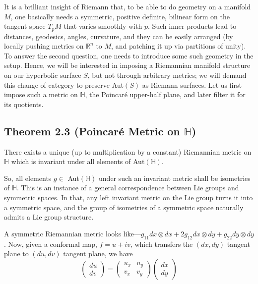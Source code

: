\documentclass[11pt,a4paper]{article}
\begin{document}
        It is a brilliant insight of Riemann that, to be able to do geometry on a manifold $M$, one basically needs a symmetric, positive definite, bilinear form on the tangent space $T_pM$ that varies smoothly with $p$. Such inner products lead to distances, geodesics, angles, curvature, and they can be easily arranged (by locally pushing metrics on $\mathbb{R}^n$ to $M$, and patching it up via partitions of unity). To answer the second question, one needs to introduce some such geometry in the setup. Hence, we will be interested in imposing a Riemannian manifold structure on our hyperbolic surface $S$, but not through arbitrary metrics; we will demand this change of category to preserve Aut$(S)$ as Riemann surfaces. Let us first impose such a metric on $\mathbb{H}$, the Poincar\'e upper-half plane, and later filter it for its quotients.

        \subsection*{Theorem 2.3 (Poincar\'e Metric on $\mathbb{H}$)} There exists a unique (up to multiplication by a constant) Riemannian metric on $\mathbb{H}$ which is invariant under all elements of Aut$(\mathbb{H})$.



        So, all elements $g \in$ Aut$(\mathbb{H})$ under such an invariant metric shall be isometries of $\mathbb{H}$. This is an instance of a general correspondence between Lie groups and symmetric spaces. In that, any left invariant metric on the Lie group turns it into a symmetric space, and the group of isometries of a symmetric space naturally admits a Lie group structure.

        A symmetric Riemannian metric looks like---$g_{11}dx\otimes dx + 2g_{12}dx\otimes dy + g_{22}dy\otimes dy$. Now, given a conformal map, $f = u + iv$, which transfers the $(dx, dy)$ tangent plane to $(du, dv)$ tangent plane, we have
        $$\begin{pmatrix} du\\dv
            \end{pmatrix} = \begin{pmatrix} u_x & u_y\\ v_x & v_y \end{pmatrix} \begin{pmatrix} dx\\dy \end{pmatrix}$$
\end{document}

